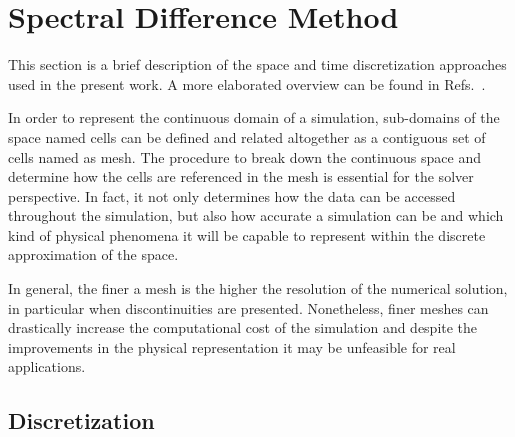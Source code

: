 \section{Spectral Difference Method}

This section is a brief description of the space and time discretization approaches used in the present work. A more elaborated overview can be found in Refs.\ \cite{SD_I:06, SD_II:07, SD_May:06, KrisVanDenAbeele2009, Moreira2016}. %

In order to represent the continuous domain of a simulation, sub-domains of the space named cells can be defined and related altogether as a contiguous set of cells named as mesh. The procedure to break down the continuous space and determine how the cells are referenced in the mesh is essential for the solver perspective. In fact, it not only determines how the data can be accessed throughout the simulation, but also how accurate a simulation can be and which kind of physical phenomena it will be capable to represent within the discrete approximation of the space. 

In general, the finer a mesh is the higher the resolution of the numerical solution, in particular when discontinuities are presented. Nonetheless, finer meshes can drastically increase the computational cost of the simulation and despite the improvements in the physical representation it may be unfeasible for real applications. 

\subsection{Discretization}

